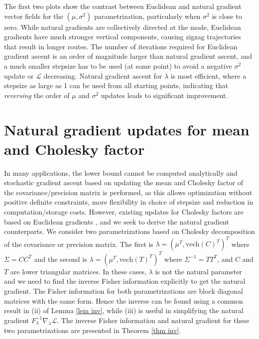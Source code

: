 \documentclass{statsoc}
\newcommand\mL{{\mathcal{L}}}
\newcommand{\vech}{\text{vech}}
\begin{document}
The first two plots show the contrast between Euclidean and natural gradient vector fields for the $(\mu, \sigma^2)$ parametrization, particularly when $\sigma^2$ is close to zero. While natural gradients are collectively directed at the mode, Euclidean gradients have much stronger vertical components, causing zigzag trajectories that result in longer routes. The number of iterations required for Euclidean gradient ascent is an order of magnitude larger than natural gradient ascent, and a much smaller stepsize has to be used (at some point) to avoid a negative $\sigma^2$ update or $\mL$ decreasing. Natural gradient ascent for $\lambda$ is most efficient, where a stepsize as large as 1 can be used from all starting points, indicating that {\em reversing} the order of $\mu$ and $\sigma^2$ updates leads to significant improvement.



\section{Natural gradient updates for mean and Cholesky factor} \label{sec_Gauss}
In many applications, the lower bound cannot be computed analytically and stochastic gradient ascent based on updating the mean and Cholesky factor of the covariance/precision matrix is performed, as this allows optimization without positive definite constraints, more flexibility in choice of stepsize and reduction in computation/storage costs. However, existing updates for Cholesky factors are based on Euclidean gradients \citep{Titsias2014, Tan2018}, and we seek to derive the natural gradient counterparts. We consider two parametrizations based on Cholesky decomposition of the covariance or precision matrix. The first is $\lambda = (\mu^T , \vech(C)^T )^T$ where $\Sigma = CC^T$ and the second is $\lambda = (\mu^T , \vech(T)^T )^T$ where $\Sigma^{-1} = TT^T$, and $C$ and $T$ are lower triangular matrices. In these cases, $\lambda$ is not the natural parameter and we need to find the inverse Fisher information explicitly to get the natural gradient. The Fisher information for both parametrizations are block diagonal matrices with the same form. Hence the inverse can be found using a common result in (ii) of Lemma \ref{lem inv}, while (iii) is useful in simplifying the natural gradient $F_\lambda^{-1} \nabla_\lambda \mL$. The inverse Fisher information and natural gradient for these two parametrizations are presented in Theorem \ref{thm inv}. 
\end{document}
